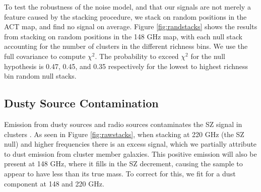 \documentclass[a4paper,fleqn,usenatbib]{mnras}
\newcommand{\revisit}{\textcolor{red}}
\begin{document}
To test the robustness of the noise model, and that our signals are not merely a feature caused by the stacking procedure, we stack on random positions in the ACT map, and find no signal on average. 
Figure \ref{fig:randstacks} shows the results from stacking on random positions in the 148 GHz map, with each null stack accounting for the number of clusters in the different richness bins.   %
We use the full covariance to compute $\chi^2$.  The probability to exceed $\chi^2$ for the null hypothesis is 0.47, 0.45, and 0.35 respectively for the lowest to highest richness bin random null stacks.  


\subsection{Dusty Source Contamination}
\label{sec:dustprof}
Emission from dusty sources and radio sources contaminates the SZ signal in clusters \citep{2005A&A...439..901A}. As seen in Figure \ref{fig:rawstacks}, when stacking at 220 GHz (the SZ null) and higher frequencies there is an excess signal, which we partially attribute to dust emission from cluster member galaxies. 
This positive emission will also be present at 148 GHz, where it fills in the SZ decrement, causing the sample to appear to have less than its true mass. 
To correct for this, we fit for a dust component at 148 and 220 GHz.  
\end{document}

